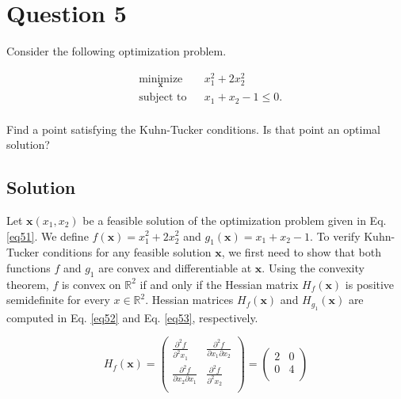 
\section*{Question 5}

Consider the following optimization problem.

\begin{equation}
\begin{aligned}
& \underset{\mathbf{x}}{\text{minimize}} & & x_1^2 + 2x_2^2\\
& \text{subject to} & & x_1 + x_2 - 1 \leqslant 0.\\
\end{aligned}
\label{eq51}
\end{equation}

Find a point satisfying the Kuhn-Tucker conditions.
Is that point an optimal solution?

\subsection*{Solution}

Let $\mathbf{x}(x_1, x_2)$ be a feasible solution of the optimization problem given in Eq. \ref{eq51}.
We define $f(\mathbf{x}) = x_1^2 + 2x_2^2$ and $g_1(\mathbf{x}) = x_1 + x_2 - 1$.
To verify Kuhn-Tucker conditions for any feasible solution $\mathbf{x}$, we first need to show that both functions $f$ and $g_1$ are convex and differentiable at $\mathbf{x}$.
Using the convexity theorem, $f$ is convex on $\mathbb{R}^2$ if and only if the Hessian matrix $H_f(\mathbf{x})$ is positive semidefinite for every $x\in \mathbb{R}^2$.
Hessian matrices $H_f(\mathbf{x})$ and $H_{g_1}(\mathbf{x})$ are computed in Eq. \ref{eq52} and Eq. \ref{eq53}, respectively.

\begin{equation}
H_f(\mathbf{x})
= \begin{pmatrix}
\frac{\partial^2 f}{\partial^2 x_1} & \frac{\partial^2 f}{\partial x_1 \partial x_2}\\[0.6em]
\frac{\partial^2 f}{\partial x_2 \partial x_1} & \frac{\partial^2 f}{\partial^2 x_2}\\
\end{pmatrix}
= \begin{pmatrix}
2 & 0\\[0.6em]
0 & 4\\
\end{pmatrix}
\label{eq52}
\end{equation}

